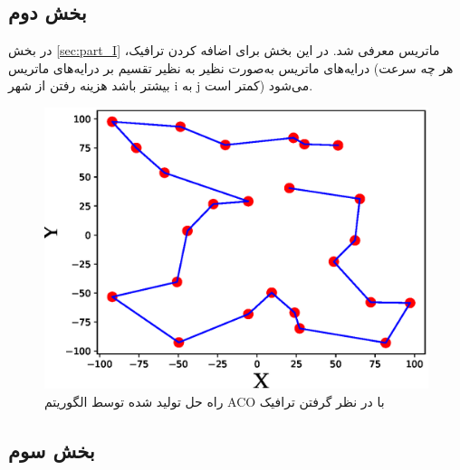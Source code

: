 \subsection{بخش دوم}\label{sec:part_II}

در بخش
\ref{sec:part_I}
ماتریس
معرفی شد. در این بخش برای اضافه کردن ترافیک، درایه‌های ماتریس
به‌صورت نظیر به نظیر تقسیم بر درایه‌های ماتریس
(هر چه سرعت بیشتر باشد هزینه رفتن از شهر i به j کمتر است) می‌شود.

\begin{figure}[H]
	\caption{راه حل تولید شده توسط الگوریتم ACO با در نظر گرفتن ترافیک} 
	\centering 
	\includegraphics[width=16cm]{../Figure/Q2/ACO_traffic_solution} 
\end{figure}

\subsection{بخش سوم}\label{sec:part_III}

